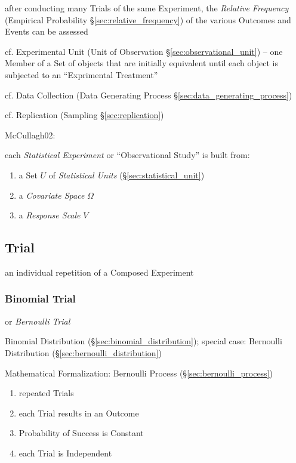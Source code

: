 after conducting many Trials of the same Experiment, the \emph{Relative
  Frequency} (Empirical Probability \S\ref{sec:relative_frequency}) of the
various Outcomes and Events can be assessed

\fist cf. Experimental Unit (Unit of Observation \S\ref{sec:observational_unit})
-- one Member of a Set of objects that are initially equivalent until each
object is subjected to an ``Exprimental Treatment''

\fist cf. Data Collection (Data Generating Process
\S\ref{sec:data_generating_process})

\fist cf. Replication (Sampling \S\ref{sec:replication})

\asterism


McCullagh02:

each \emph{Statistical Experiment} or ``Observational Study'' is built from:
\begin{enumerate}
  \item a Set $U$ of \emph{Statistical Units} (\S\ref{sec:statistical_unit})
  \item a \emph{Covariate Space} $\Omega$
  \item a \emph{Response Scale} $V$
\end{enumerate}



\subsection{Trial}\label{sec:trial}

an individual repetition of a Composed Experiment



\subsubsection{Binomial Trial}\label{sec:binomial_trial}

or \emph{Bernoulli Trial}

Binomial Distribution (\S\ref{sec:binomial_distribution}); special case:
Bernoulli Distribution (\S\ref{sec:bernoulli_distribution})

Mathematical Formalization: Bernoulli Process (\S\ref{sec:bernoulli_process})

\begin{enumerate}
  \item repeated Trials
  \item each Trial results in an Outcome
  \item Probability of Success is Constant
  \item each Trial is Independent
\end{enumerate}

